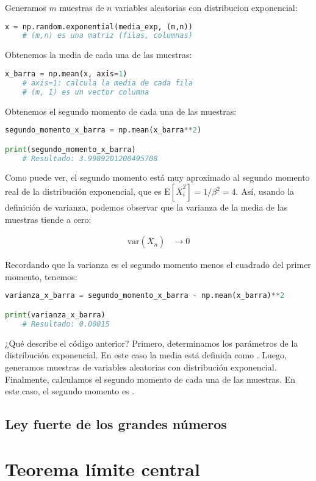 \documentclass[8pt]{article}
\newcommand{\code}[1]{\texttt{\color{frenchplum}{#1}}}
\begin{document}
Generamos $m$ muestras de $n$ variables aleatorias con distribucion exponencial:

\begin{lstlisting}[language=Python]
x = np.random.exponential(media_exp, (m,n))
    # (m,n) es una matriz (filas, columnas)
\end{lstlisting}

Obtenemos la media de cada una de las muestras:

\begin{lstlisting}[language=Python]
x_barra = np.mean(x, axis=1)
    # axis=1: calcula la media de cada fila
    # (m, 1) es un vector columna
\end{lstlisting}

Obtenemos el segundo momento de cada una de las muestras:

\begin{lstlisting}[language=Python]
segundo_momento_x_barra = np.mean(x_barra**2)

print(segundo_momento_x_barra)
    # Resultado: 3.9989201200495708
\end{lstlisting}

Como puede ver, el segundo momento está muy aproximado al segundo momento real de la distribución exponencial, que es $\text{E}[\overline{X}^2_i] = 1/\beta^2 = 4$. Así, usando la definición de varianza, podemos observar que la varianza de la media de las muestras tiende a cero:

\begin{align*}
    \text{var}(\overline{X}_n) &\longrightarrow 0
\end{align*}

Recordando que la varianza es el segundo momento menos el cuadrado del primer momento, tenemos:

\begin{lstlisting}[language=Python]
varianza_x_barra = segundo_momento_x_barra - np.mean(x_barra)**2

print(varianza_x_barra)
    # Resultado: 0.00015
\end{lstlisting}

¿Qué describe el código anterior? Primero, determinamos los parámetros de la distribución exponencial. En este caso la media está definida como \code{media\_exp = 2}. Luego, generamos \code{m} muestras de \code{n} variables aleatorias con distribución exponencial. Finalmente, calculamos el segundo momento de cada una de las muestras. En este caso, el segundo momento es \code{4.0000000000000004}.




\subsection{Ley fuerte de los grandes números}




\section{Teorema límite central}
\end{document}

